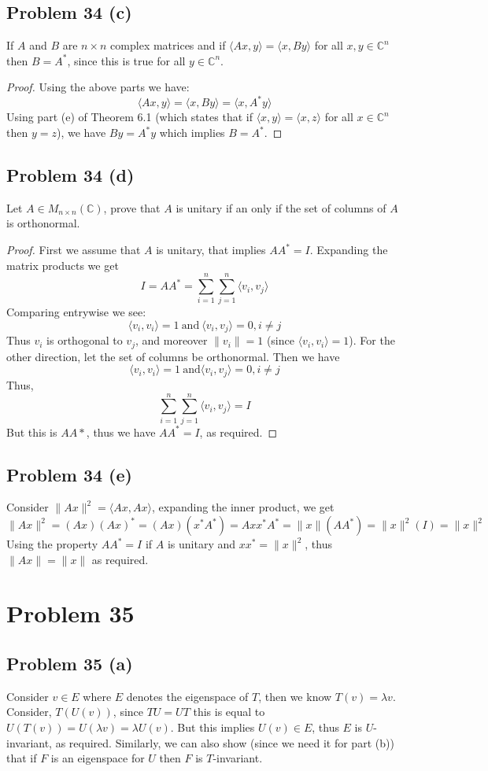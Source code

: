 \documentclass{article}[10pt]
\def\CC{\mathbb C}
\begin{document}
\subsection{Problem 34 (c)}
If $A$ and $B$ are $n \times n$ complex matrices and if
$\langle Ax,y \rangle = \langle x,By \rangle$ for all $x,y \in \CC^n$ then
$B=A^*$, since this is true for all $y\in \CC^n$.
\begin{proof}
Using the above parts we have:
\[
\langle Ax,y \rangle = \langle x,By\rangle = \langle x,A^*y\rangle
\]
Using part (e) of Theorem 6.1 (which states that if 
$\langle x,y \rangle = \langle x,z \rangle$ for all $x \in \CC^n$ then
$y=z$), we have $By=A^*y$ which implies $B=A^*$.
\end{proof}
\subsection{Problem 34 (d)}
Let $A\in M_{n \times n}(\CC)$, prove that $A$ is unitary if an only if the 
set of columns of $A$ is orthonormal.
\begin{proof}
First we assume that $A$ is unitary, that implies $AA^*=I$. Expanding
the matrix products we get
\[
I=AA^* = \sum_{i=1}^n \sum_{j=1}^n \langle v_i,v_j\rangle
\]
Comparing entrywise we see:
\[
\langle v_i,v_i \rangle = 1 \ \textrm{and}\ \langle v_i,v_j \rangle = 0, i \ne j
\]
Thus $v_i$ is orthogonal to $v_j$, and moreover $\|v_i\|=1$ (since 
$\langle v_i,v_i \rangle=1$).
For the other direction, let the set of columns be orthonormal.
Then we have
\[
\langle v_i,v_i \rangle = 1 \ \textrm{and} \langle v_i,v_j \rangle = 0, i \ne j
\]
Thus,
\[
\sum_{i=1}^n \sum_{j=1}^n \langle v_i,v_j\rangle = I
\]
But this is $AA*$, thus we have $AA^*=I$, as required.
\end{proof}
\subsection{Problem 34 (e)}
Consider $\|Ax\|^2 = \langle Ax,Ax \rangle$, expanding the inner product, we
get
\[
\|Ax\|^2 = (Ax)(Ax)^* = (Ax)(x^*A^*) = Axx^*A^* = \|x\|(AA^*) = \|x\|^2(I) = \|x\|^2
\]
Using the property $AA^*=I$ if $A$ is unitary and $xx^*=\|x\|^2$, thus $\|Ax\|=\|x\|$ as
required.
\section{Problem 35}
\subsection{Problem 35 (a)}
Consider $v\in E$ where $E$ denotes the eigenspace of $T$, then
we know  $T(v) = \lambda v$. Consider, $T(U(v))$, since $TU=UT$ this is
equal to $U(T(v))=U(\lambda v)=\lambda U(v)$. But this implies
$U(v) \in E$, thus $E$ is $U$-invariant, as required. Similarly, we
can also show (since we need it for part (b)) that if $F$ is an eigenspace
for $U$ then $F$ is $T$-invariant.
\end{document}
